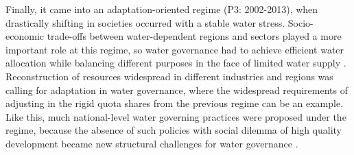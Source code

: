 Finally, it came into an adaptation-oriented regime (P3: 2002-2013), when drastically shifting in societies occurred with a stable water stress.
Socio-economic trade-offs between water-dependent regions and sectors played a more important role at this regime, so water governance had to achieve efficient water allocation while balancing different purposes in the face of limited water supply
\cite{dalinBalancingwaterresource2015}.
Reconstruction of resources widespread in different industries and regions was calling for adaptation in water governance, where the widespread requirements of adjusting in the rigid quota shares from the previous regime can be an example.
Like this, much national-level water governing practices were proposed under the regime, because the absence of such policies with social dilemma of high quality development became new structural challenges for water governance
\cite{konarExpandingScopeFoundation2019}.

